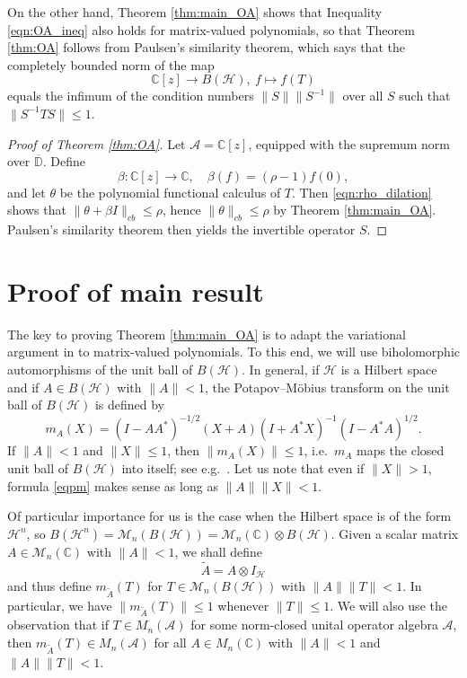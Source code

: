 \documentclass[12pt]{amsart}
\theoremstyle{definition}
\renewcommand{\H}{{\mathcal H}}
\newcommand\matn{{\mathcal M}_n}
\newcommand\ta{{\tilde{A}}}
\begin{document}
On the other hand,
Theorem \ref{thm:main_OA} shows that Inequality \eqref{eqn:OA_ineq} also holds for matrix-valued polynomials,
so that Theorem \ref{thm:OA} follows from Paulsen's similarity theorem, which says that the completely bounded norm of the map 
\[
\mathbb{C}[z]\to B(\H),\ f \mapsto f(T)
\]
equals the infimum of the condition numbers $\|S\| \|S^{-1}\|$ over all $S$ such that $\|S^{-1} T S\| \le 1$.


\begin{proof}[Proof of Theorem \ref{thm:OA}]
  Let $\mathcal{A} = \mathbb{C}[z]$, equipped with the supremum norm over $\overline{\mathbb{D}}$. Define 
  \[
    \beta: \mathbb C[z] \to \mathbb{C}, \quad \beta(f) = (\rho-1) f(0),
  \]
  and let $\theta$ be the polynomial functional calculus of $T$. Then \eqref{eqn:rho_dilation} shows that $\|\theta + \beta I \|_{cb} \le \rho$, hence $\|\theta\|_{cb} \le \rho$ by Theorem \ref{thm:main_OA}. Paulsen's similarity theorem \cite[Theorem 9.1]{Paulsen02} then yields the invertible operator $S$.
\end{proof}



\section{Proof of main result}

The key to proving Theorem \ref{thm:main_OA} is to adapt the variational argument in \cite{CGL17} to matrix-valued polynomials. To this end, we will use biholomorphic
automorphisms of the unit ball of $B(\H)$.
In general, if $\mathcal{H}$ is a Hilbert space and if $A \in B(\mathcal{H})$ with $\|A\| < 1$, the Potapov--M\"obius transform on the unit ball of $B(\mathcal{H})$
is defined by
\begin{equation}
\label{eqpm}
  m_A(X) = (I - A A^*)^{-1/2} (X + A)(I + A^* X)^{-1} (I - A^* A)^{1/2}.
\end{equation}
If $\|A\| < 1$ and $\|X\| \le 1$, then $\|m_A(X)\| \le 1$, i.e.\ $m_A$ maps the closed unit ball of $B(\mathcal{H})$ into itself; see e.g.\ \cite[Theorem 8.19]{IS85}.
Let us note that even if $\| X \| > 1$, formula \eqref{eqpm} makes sense as long as  $\|A\| \|X\| < 1$.


Of particular importance for us is the case when the Hilbert space is of the form $\mathcal{H}^n$, so $B(\mathcal{H}^n) = \matn(B(\mathcal{H})) = \matn(\mathbb{C}) \otimes B(\mathcal{H})$. Given a scalar matrix $A \in \matn(\mathbb{C})$ with $\|A\| < 1$, we
shall define
\[
\ta = A \otimes I_{\mathcal{H}}
\]
 and thus define $m_\ta(T)$ for $T \in \matn(B(\mathcal{H}))$ with $\|A\| \|T\| < 1$.
In particular, we have $\|m_\ta(T)\| \le 1$ whenever $\|T\| \le 1$. We will also
use the observation that if $T \in M_n(\mathcal{A})$ for some norm-closed unital operator algebra $\mathcal{A}$,
then $m_{\ta}(T) \in M_n(\mathcal{A})$ for all $A \in M_n(\mathbb{C})$ with $\|A\| < 1$ and $\|A\| \|T\| < 1$.
\end{document}
